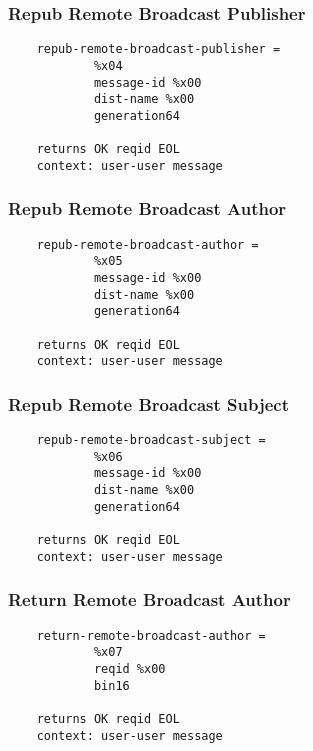 \documentclass[letterpaper,11pt,oneside]{article}
\begin{document}
\subsubsection{Repub Remote Broadcast Publisher}

\vspace{10pt}
\begin{verbatim}
    repub-remote-broadcast-publisher = 
            %x04 
            message-id %x00 
            dist-name %x00 
            generation64

    returns OK reqid EOL
    context: user-user message
\end{verbatim}
\vspace{10pt}


\subsubsection{Repub Remote Broadcast Author}

\vspace{10pt}
\begin{verbatim}
    repub-remote-broadcast-author = 
            %x05 
            message-id %x00 
            dist-name %x00 
            generation64

    returns OK reqid EOL
    context: user-user message
\end{verbatim}
\vspace{10pt}


\subsubsection{Repub Remote Broadcast Subject}

\vspace{10pt}
\begin{verbatim}
    repub-remote-broadcast-subject = 
            %x06
            message-id %x00
            dist-name %x00
            generation64

    returns OK reqid EOL
    context: user-user message
\end{verbatim}
\vspace{10pt}


\subsubsection{Return Remote Broadcast Author}

\vspace{10pt}
\begin{verbatim}
    return-remote-broadcast-author =
            %x07
            reqid %x00
            bin16

    returns OK reqid EOL
    context: user-user message
\end{verbatim}
\vspace{10pt}
\end{document}
